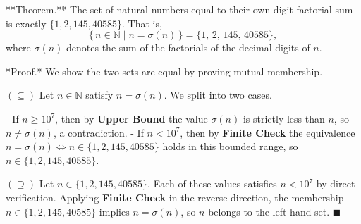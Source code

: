 **Theorem.** The set of natural numbers equal to their own digit factorial sum is exactly $\{1, 2, 145, 40585\}$. That is,
$$\{\, n \in \mathbb{N} \mid n = \sigma(n) \,\} = \{1,\, 2,\, 145,\, 40585\},$$
where $\sigma(n)$ denotes the sum of the factorials of the decimal digits of $n$.

*Proof.* We show the two sets are equal by proving mutual membership.

$(\subseteq)$ Let $n \in \mathbb{N}$ satisfy $n = \sigma(n)$. We split into two cases.

- If $n \geq 10^7$, then by \textbf{Upper Bound} the value $\sigma(n)$ is strictly less than $n$, so $n \neq \sigma(n)$, a contradiction.
- If $n < 10^7$, then by \textbf{Finite Check} the equivalence $n = \sigma(n) \iff n \in \{1, 2, 145, 40585\}$ holds in this bounded range, so $n \in \{1, 2, 145, 40585\}$.

$(\supseteq)$ Let $n \in \{1, 2, 145, 40585\}$. Each of these values satisfies $n < 10^7$ by direct verification. Applying \textbf{Finite Check} in the reverse direction, the membership $n \in \{1, 2, 145, 40585\}$ implies $n = \sigma(n)$, so $n$ belongs to the left-hand set. $\blacksquare$
